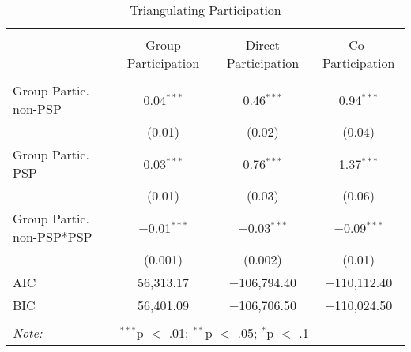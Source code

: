
\begin{table}[!htbp] \centering 
  \caption{Triangulating Participation} 
  \label{table:partmods} 
\begin{tabular}{@{\extracolsep{5pt}}lccc} 
\\[-1.8ex]\hline \\[-1.8ex] 
 & Group Participation & Direct Participation & Co-Participation \\ 
\hline \\[-1.8ex] 
 Group Partic. non-PSP & 0.04$^{***}$ &  0.46$^{***}$&0.94$^{***}$  \\ 
  & (0.01) & (0.02) &(0.04)   \\ 
  Group Partic. PSP & 0.03$^{***}$ &  0.76$^{***}$ &1.37$^{***}$  \\ 
  & (0.01) & (0.03) & (0.06)  \\ 
  Group Partic. non-PSP*PSP & $-$0.01$^{***}$ &  $-$0.03$^{***}$ &$-$0.09$^{***}$  \\ 
  & (0.001) & (0.002) &  (0.01) \\ 
 AIC & 56,313.17 & $-$106,794.40 & $-$110,112.40 \\ 
BIC & 56,401.09 & $-$106,706.50 & $-$110,024.50 \\ 
\hline \\[-1.8ex] 
\textit{Note:} & \multicolumn{3}{l}{$^{***}$p $<$ .01; $^{**}$p $<$ .05; $^{*}$p $<$ .1} \\ 
\end{tabular} 
\end{table} 
